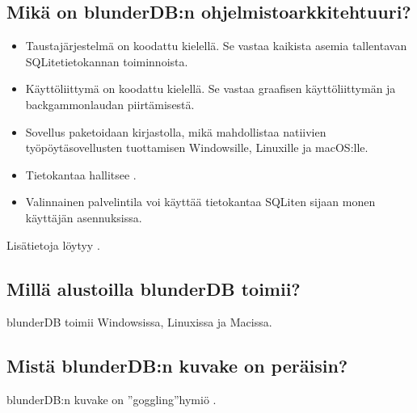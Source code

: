 \documentclass[letterpaper,10pt,finnish]{sphinxmanual}
\begin{document}
\subsection{Mikä on blunderDB:n ohjelmistoarkkitehtuuri?}
\label{\detokenize{faq:quel-est-l-architecture-logicielle-de-blunderdb}}\begin{itemize}
\item {} 
\sphinxAtStartPar
Taustajärjestelmä on koodattu \sphinxhyphen{}kielellä. Se vastaa kaikista asemia tallentavan SQLite\sphinxhyphen{}tietokannan toiminnoista.

\item {} 
\sphinxAtStartPar
Käyttöliittymä on koodattu \sphinxhyphen{}kielellä. Se vastaa graafisen käyttöliittymän ja backgammon\sphinxhyphen{}laudan piirtämisestä.

\item {} 
\sphinxAtStartPar
Sovellus paketoidaan \sphinxhyphen{}kirjastolla, mikä mahdollistaa natiivien työpöytäsovellusten tuottamisen Windowsille, Linuxille ja macOS:lle.

\item {} 
\sphinxAtStartPar
Tietokantaa hallitsee .

\item {} 
\sphinxAtStartPar
Valinnainen palvelintila voi käyttää \sphinxhyphen{}tietokantaa SQLiten sijaan monen käyttäjän asennuksissa.

\end{itemize}

\sphinxAtStartPar
Lisätietoja löytyy .


\subsection{Millä alustoilla blunderDB toimii?}
\label{\detokenize{faq:sur-quelles-plateformes-blunderdb-fonctionne-t-il}}
\sphinxAtStartPar
blunderDB toimii Windowsissa, Linuxissa ja Macissa.


\subsection{Mistä blunderDB:n kuvake on peräisin?}
\label{\detokenize{faq:d-ou-vient-l-icone-de-blunderdb}}
\sphinxAtStartPar
blunderDB:n kuvake on ”goggling”\sphinxhyphen{}hymiö .
\end{document}
